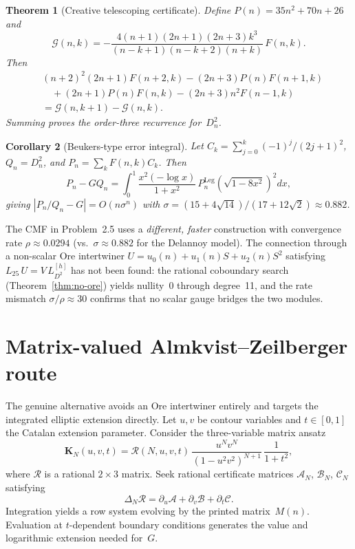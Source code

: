 \documentclass[11pt]{article}
\newtheorem{theorem}{Theorem}
\newtheorem{corollary}[theorem]{Corollary}
\begin{document}
\begin{theorem}[Creative telescoping certificate]
Define $P(n) = 35n^2+70n+26$ and
\[
\mathcal{G}(n,k) = -\frac{4(n+1)(2n+1)(2n+3)k^3}
{(n-k+1)(n-k+2)(n+k)}\,F(n,k).
\]
Then
\begin{align*}
&(n+2)^2(2n+1)F(n+2,k) - (2n+3)P(n)F(n+1,k) \\
&\quad+ (2n+1)P(n)F(n,k) - (2n+3)n^2 F(n-1,k) \\
&= \mathcal{G}(n,k+1) - \mathcal{G}(n,k).
\end{align*}
Summing proves the order-three recurrence for~$D_n^2$.
\end{theorem}

\begin{corollary}[Beukers-type error integral]
Let $C_k = \sum_{j=0}^k (-1)^j/(2j+1)^2$,
$Q_n = D_n^2$, and $P_n = \sum_k F(n,k)C_k$. Then
\[
P_n - G Q_n = \int_0^1
\frac{x^2(-\log x)}{1+x^2}\,
P_n^{\mathrm{Leg}}\!\left(\sqrt{1-8x^2}\right)^2 dx,
\]
giving $|P_n/Q_n - G| = O(n\sigma^n)$ with
$\sigma = (15+4\sqrt{14})/(17+12\sqrt{2}) \approx 0.882$.
\end{corollary}

The CMF in Problem~2.5 uses a \emph{different, faster}
construction with convergence rate $\rho \approx 0.0294$
(vs.\ $\sigma \approx 0.882$ for the Delannoy model).
The connection through a non-scalar Ore intertwiner
$U = u_0(n) + u_1(n)S + u_2(n)S^2$ satisfying
$L_{25}\,U = V\,L_{D^2}^{[h]}$ has not been found:
the rational coboundary search (Theorem~\ref{thm:no-ore})
yields nullity~$0$ through degree~11, and the rate mismatch
$\sigma/\rho \approx 30$ confirms that no scalar gauge
bridges the two modules.

\section{Matrix-valued Almkvist--Zeilberger route}

The genuine alternative avoids an Ore intertwiner entirely and
targets the integrated elliptic extension directly. Let
$u,v$ be contour variables and $t \in [0,1]$ the Catalan
extension parameter. Consider the three-variable matrix ansatz
\begin{equation}\label{eq:AZ}
\mathbf{K}_N(u,v,t) = \mathcal{R}(N,u,v,t)\,
\frac{u^N v^N}{(1 - u^2 v^2)^{N+1}}\,\frac{1}{1+t^2},
\end{equation}
where $\mathcal{R}$ is a rational $2\times 3$ matrix.
Seek rational certificate matrices $\mathcal{A}_N$,
$\mathcal{B}_N$, $\mathcal{C}_N$ satisfying
\[
\Delta_N \mathcal{R} = \partial_u \mathcal{A} + \partial_v \mathcal{B}
+ \partial_t \mathcal{C}.
\]
Integration yields a row system evolving by the printed
matrix~$M(n)$. Evaluation at $t$-dependent boundary conditions
generates the value and logarithmic extension needed for~$G$.
\end{document}
